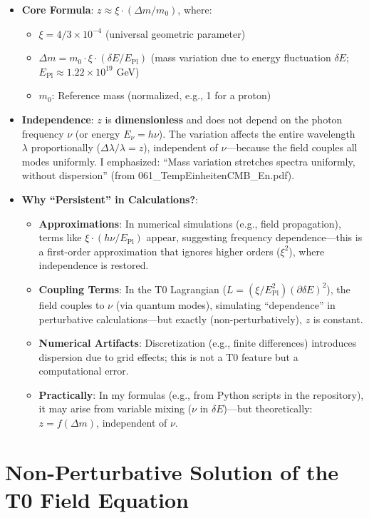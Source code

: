 	\begin{itemize}
		\item \textbf{Core Formula}: $z \approx \xi \cdot (\Delta m / m_0)$, where:
		\begin{itemize}
			\item $\xi = 4/3 \times 10^{-4}$ (universal geometric parameter)
			\item $\Delta m = m_0 \cdot \xi \cdot (\delta E / E_{\mathrm{Pl}})$ (mass variation due to energy fluctuation $\delta E$; $E_{\mathrm{Pl}} \approx 1.22 \times 10^{19}$ GeV)
			\item $m_0$: Reference mass (normalized, e.g., 1 for a proton)
		\end{itemize}
		\item \textbf{Independence}: $z$ is \textbf{dimensionless} and does not depend on the photon frequency $\nu$ (or energy $E_\nu = h\nu$). The variation affects the entire wavelength $\lambda$ proportionally ($\Delta\lambda / \lambda = z$), independent of $\nu$—because the field couples all modes uniformly. I emphasized: ``Mass variation stretches spectra uniformly, without dispersion'' (from 061\_TempEinheitenCMB\_En.pdf).
		\item \textbf{Why ``Persistent'' in Calculations?}:
		\begin{itemize}
			\item \textbf{Approximations}: In numerical simulations (e.g., field propagation), terms like $\xi \cdot (h\nu / E_{\mathrm{Pl}})$ appear, suggesting frequency dependence—this is a first-order approximation that ignores higher orders ($\xi^2$), where independence is restored.
			\item \textbf{Coupling Terms}: In the T0 Lagrangian ($L = (\xi / E_{\mathrm{Pl}}^2) (\partial \delta E)^2$), the field couples to $\nu$ (via quantum modes), simulating ``dependence'' in perturbative calculations—but exactly (non-perturbatively), $z$ is constant.
			\item \textbf{Numerical Artifacts}: Discretization (e.g., finite differences) introduces dispersion due to grid effects; this is not a T0 feature but a computational error.
			\item \textbf{Practically}: In my formulas (e.g., from Python scripts in the repository), it may arise from variable mixing ($\nu$ in $\delta E$)—but theoretically: $z = f(\Delta m)$, independent of $\nu$.
		\end{itemize}
	\end{itemize}
	
	\section{Non-Perturbative Solution of the T0 Field Equation}
	
